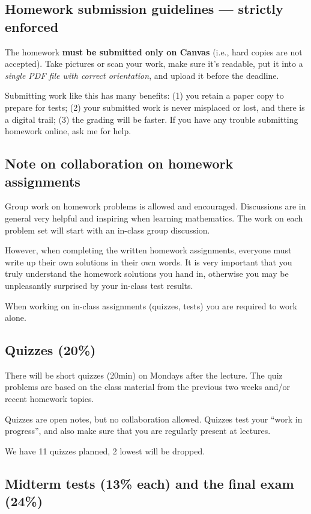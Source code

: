 \documentclass[oneside,11pt]{amsart}
\begin{document}
\subsection*{Homework submission guidelines --- strictly enforced}
The homework \textbf{must be submitted only on Canvas} (i.e., hard copies are not accepted).
Take pictures or scan your work,
make sure it's readable,
put it into a \emph{single PDF file with correct orientation},
and upload it before the deadline.

Submitting work like this has many benefits:
(1) you retain a paper copy to
prepare for tests;
(2) your submitted work is never misplaced or lost, and there is a digital trail;
(3) the grading will be faster.
If you have any trouble submitting homework online, ask me for help.

\subsection*{Note on collaboration on homework assignments}
\label{collaboration}

Group work on homework problems is allowed and encouraged.
Discussions are in general very
helpful and inspiring when learning mathematics.
The work on each problem set will start with an in-class group discussion.

However, when completing the written homework assignments, everyone must write up their own
solutions in their own words.
It is very important that you truly understand the homework solutions you hand
in, otherwise you may be unpleasantly surprised by your in-class test results.

When working on in-class assignments (quizzes, tests)
you are required to work alone.

\subsection{Quizzes (20\%)}

There will be short quizzes (20min) on Mondays after the lecture.
The quiz problems are based on the class material from the previous two weeks
and/or recent homework topics.

Quizzes are open notes, but no collaboration allowed.
Quizzes test your ``work in progress'', and also make sure that you are regularly present at lectures.

We have 11 quizzes planned, 2 lowest will be dropped.

\subsection{Midterm tests (13\% each) and the final exam (24\%)}
\end{document}
